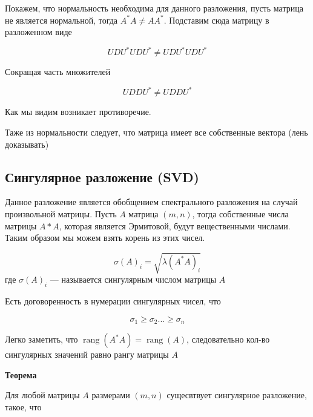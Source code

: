 \documentclass{article}
\begin{document}
    \quad 

    Покажем, что нормальность необходима для данного разложения, пусть матрица не является нормальной, тогда 
    $A^{*}A \neq A A^{*}$. Подставим сюда матрицу в разложенном виде 

    \begin{equation}
        U D U^{*} U D U^{*} \neq U D U^{*} U D U^{*}
    \end{equation}

    Сокращая часть множителей

    \begin{equation}
        U D D U^{*} \neq U D D U^{*}
    \end{equation}

    Как мы видим возникает противоречие.

    Таже из нормальности следует, что матрица имеет все собственные вектора (лень доказывать)


    \subsection{Сингулярное разложение (SVD)}

    Данное разложение является обобщением спектрального разложения на случай произвольной матрицы.
    Пусть $A$ матрица $(m, n)$, тогда собственные числа матрицы $A{*}A$, которая является Эрмитовой, будут вещественными числами.
    Таким образом мы можем взять корень из этих чисел.

    \begin{equation}
        \sigma(A)_{i} = \sqrt{ \lambda(A^{*}A)_{i} }
    \end{equation}
    где $\sigma(A)_{i}$ --- называется сингулярным числом матрицы $A$ 

    \quad 

    Есть договоренность в нумерации сингулярных чисел, что 

    \begin{equation}
        \sigma_{1} \geq \sigma_{2} ... \geq \sigma_{n}
    \end{equation}

    Легко заметить, что $\operatorname{rang}(A^{*}A) = \operatorname{rang}(A)$, следовательно
    кол-во сингулярных значений равно рангу матрицы $A$

    \quad 

    \textbf{Теорема}

    \quad 

    Для любой матрицы $A$ размерами $(m, n)$ сущесвтвует сингулярное разложение, такое, что 
\end{document}
